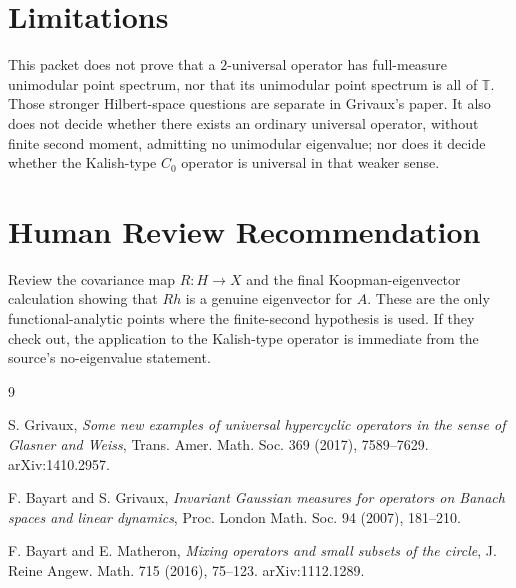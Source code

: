 \documentclass[11pt]{article}
\newcommand{\T}{\mathbb T}
\begin{document}
\section*{Limitations}

This packet does not prove that a $2$-universal operator has full-measure unimodular point spectrum, nor that its unimodular point spectrum is all of $\T$. Those stronger Hilbert-space questions are separate in Grivaux's paper. It also does not decide whether there exists an ordinary universal operator, without finite second moment, admitting no unimodular eigenvalue; nor does it decide whether the Kalish-type $C_0$ operator is universal in that weaker sense.

\section*{Human Review Recommendation}

Review the covariance map $R:H\to X$ and the final Koopman-eigenvector calculation showing that $Rh$ is a genuine eigenvector for $A$. These are the only functional-analytic points where the finite-second hypothesis is used. If they check out, the application to the Kalish-type operator is immediate from the source's no-eigenvalue statement.

\begin{thebibliography}{9}

S. Grivaux,
\emph{Some new examples of universal hypercyclic operators in the sense of Glasner and Weiss},
Trans. Amer. Math. Soc. 369 (2017), 7589--7629.
arXiv:1410.2957.

F. Bayart and S. Grivaux,
\emph{Invariant Gaussian measures for operators on Banach spaces and linear dynamics},
Proc. London Math. Soc. 94 (2007), 181--210.

F. Bayart and E. Matheron,
\emph{Mixing operators and small subsets of the circle},
J. Reine Angew. Math. 715 (2016), 75--123.
arXiv:1112.1289.

\end{thebibliography}
\end{document}

